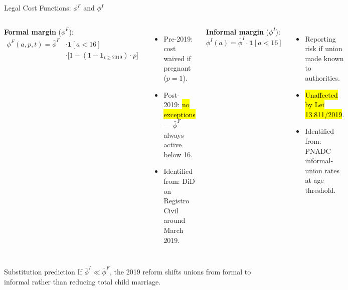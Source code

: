 \begin{frame}{Legal Cost Functions: $\phi^F$ and $\phi^I$}
    \begin{columns}[T]
        \textbf{Formal margin} ($\phi^F$):
        \begin{align*}
            \phi^F(a,p,t) = \bar\phi^F
            &\cdot \mathbf{1}[a < 16] \\
            &\cdot \bigl[1-(1-\mathbf{1}_{t \ge 2019})\cdot p\bigr]
        \end{align*}
        \begin{itemize}\small
            \item Pre-2019: cost waived if pregnant ($p=1$).
            \item Post-2019: \hl{no exceptions} --- $\bar\phi^F$ always active below 16.
            \item Identified from: DiD on Registro Civil around March 2019.
        \end{itemize}

        \textbf{Informal margin} ($\phi^I$):
        \[
            \phi^I(a) = \bar\phi^I \cdot \mathbf{1}[a < 16]
        \]
        \begin{itemize}\small
            \item Reporting risk if union made known to authorities.
            \item \hl{Unaffected by Lei 13.811/2019}.
            \item Identified from: PNADC informal-union rates at age threshold.
        \end{itemize}
    \end{columns}

    \vspace{0.3cm}
    \begin{alertblock}{Substitution prediction}
        If $\bar\phi^I \ll \bar\phi^F$, the 2019 reform shifts unions from
        formal to informal rather than reducing total child marriage.
    \end{alertblock}
\end{frame}

